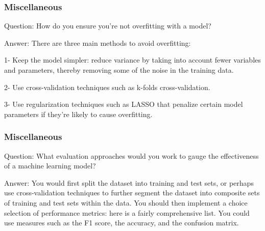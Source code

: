 \documentclass[11pt]{beamer}
\begin{document}
\begin{frame}
\frametitle{Miscellaneous}
\begin{block}{Question:}
	How do you ensure you’re not overfitting with a model?
\end{block}
\begin{block}{Answer:}
	There are three main methods to avoid overfitting:
	
	1- Keep the model simpler: reduce variance by taking into account fewer variables and parameters, thereby removing some of the noise in the training data.
	
	2- Use cross-validation techniques such as k-folds cross-validation.
	
	3- Use regularization techniques such as LASSO that penalize certain model parameters if they’re likely to cause overfitting.
\end{block}
\end{frame}

\begin{frame}
\frametitle{Miscellaneous}
\begin{block}{Question:}
	What evaluation approaches would you work to gauge the effectiveness of a machine learning model?
\end{block}
\begin{block}{Answer:}
	You would first split the dataset into training and test sets, or perhaps use cross-validation techniques to further segment the dataset into composite sets of training and test sets within the data. You should then implement a choice selection of performance metrics: here is a fairly comprehensive list. You could use measures such as the F1 score, the accuracy, and the confusion matrix.
\end{block}
\end{frame}
\end{document}

